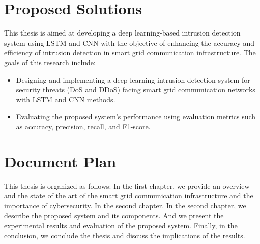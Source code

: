 \section*{Proposed Solutions}
This thesis is aimed at developing a deep learning-based intrusion detection system using LSTM and CNN with the objective of enhancing the accuracy and efficiency of intrusion detection in smart grid communication infrastructure. The goals of this research include:
\firmlist
\begin{itemize}
	\item Designing and implementing a deep learning intrusion detection system for security threats (DoS and DDoS) facing smart grid communication networks with LSTM and CNN methods.
	\item Evaluating the proposed system's performance using evaluation metrics such as accuracy, precision, recall, and F1-score.
\end{itemize}

 



\section*{Document Plan}
This thesis is organized as follows: In the first chapter, we provide an overview and the state of the art of the smart grid communication infrastructure and the importance of cybersecurity. In the second chapter. In the second chapter, we describe the proposed system and its components. And we present the experimental results and evaluation of the proposed system. Finally, in the conclusion, we conclude the thesis and discuss the implications of the results.